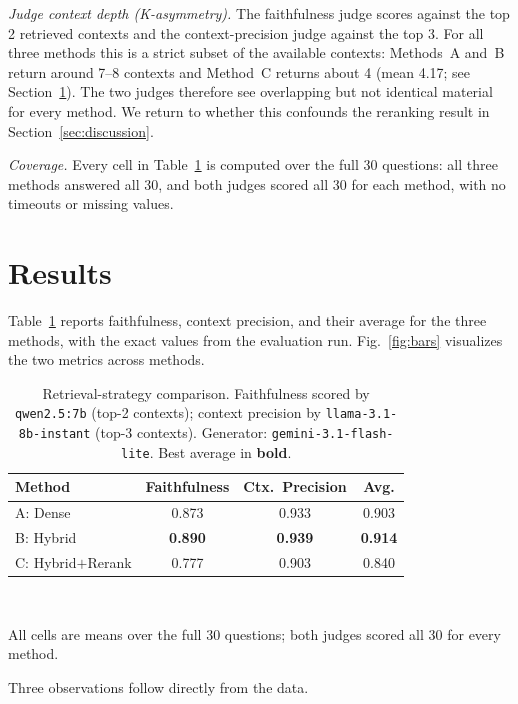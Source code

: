 \documentclass[conference]{IEEEtran}
\begin{document}
\emph{Judge context depth (K-asymmetry).} The faithfulness judge scores against
the top 2 retrieved contexts and the context-precision judge against the top 3.
For all three methods this is a strict subset of the available contexts: Methods~A
and~B return around 7--8 contexts and Method~C returns about 4 (mean 4.17; see
Section~\ref{sec:results}). The two judges therefore see overlapping but not
identical material for every method. We return to whether this confounds the
reranking result in Section~\ref{sec:discussion}.

\emph{Coverage.} Every cell in Table~\ref{tab:results} is computed over the full
30 questions: all three methods answered all 30, and both judges scored all 30
for each method, with no timeouts or missing values.

\section{Results}
\label{sec:results}
Table~\ref{tab:results} reports faithfulness, context precision, and their
average for the three methods, with the exact values from the evaluation run.
Fig.~\ref{fig:bars} visualizes the two metrics across methods.

\begin{table}[t]
\caption{Retrieval-strategy comparison. Faithfulness scored by
\texttt{qwen2.5:7b} (top-2 contexts); context precision by
\texttt{llama-3.1-8b-instant} (top-3 contexts). Generator:
\texttt{gemini-3.1-flash-lite}. Best average in \textbf{bold}.}
\label{tab:results}
\centering
\footnotesize
\begin{tabular}{@{}lccc@{}}
\toprule
\textbf{Method} & \textbf{Faithfulness} & \textbf{Ctx.\ Precision} & \textbf{Avg.} \\
\midrule
A: Dense           & 0.873          & 0.933          & 0.903 \\
B: Hybrid          & \textbf{0.890} & \textbf{0.939} & \textbf{0.914} \\
C: Hybrid$+$Rerank & 0.777          & 0.903          & 0.840 \\
\bottomrule
\end{tabular}
\\[2pt]
\begin{minipage}{0.95\linewidth}
\footnotesize All cells are means over the full 30 questions; both judges scored
all 30 for every method.
\end{minipage}
\end{table}

Three observations follow directly from the data.
\end{document}
